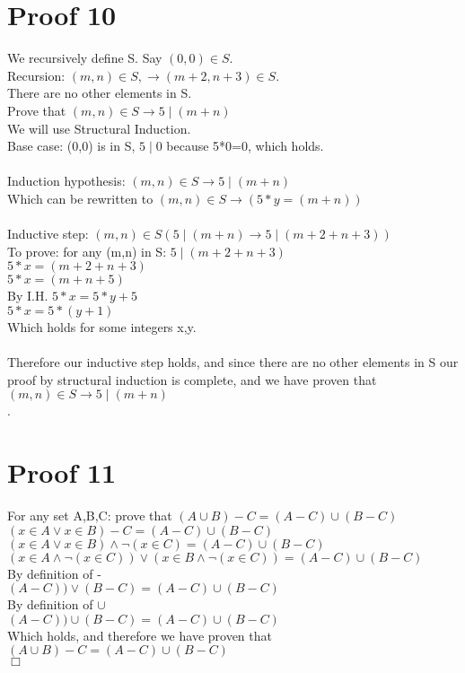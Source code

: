 \documentclass{article}
\begin{document}
\section{Proof 10}
We recursively define S. Say $(0,0) \in S$. \\Recursion: $(m,n) \in S, \rightarrow (m+2,n+3) \in S$. \\There are no other elements in S. \\Prove that $ (m,n) \in S \rightarrow 5 \mid (m+n)$\\
 
We will use Structural Induction. \\
Base case: (0,0) is in S, $5 \mid 0$ because 5*0=0, which holds.\\
\\
Induction hypothesis: $(m,n) \in S \rightarrow 5 \mid (m+n)$\\
Which can be rewritten to $(m,n) \in S \rightarrow (5*y= (m+n))$\\
\\
Inductive step: $(m,n) \in S( 5 \mid (m+n) \rightarrow 5 \mid (m+2+n+3))$\\
To prove: for any (m,n) in S: $5 \mid (m+2+n+3)$\\
$5*x = (m+2+n+3)$\\
$5*x = (m+n+5)$\\
By I.H.
$5*x = 5*y+5$\\
$5*x = 5*(y+1)$\\
Which holds for some integers x,y. \\
\\
Therefore our inductive step holds, and since there are no other elements in S our proof by structural induction is complete, and we have proven that $ (m,n) \in S \rightarrow 5 \mid (m+n)$\\.
 
\section{Proof 11}
For any set A,B,C: prove that $(A \cup B) - C = (A - C) \cup (B - C)$\\
$(x \in A \lor x \in B) - C = (A - C) \cup (B - C)$\\
$(x \in A \lor x \in B) \land \neg (x \in C) = (A - C) \cup (B - C)$\\
$(x \in A \land \neg (x \in C)) \lor (x \in B \land \neg (x \in C)) = (A - C) \cup (B - C)$\\
By definition of -\\
$(A - C)) \lor (B - C) = (A - C) \cup (B - C)$\\
By definition of $\cup$\\
$(A - C)) \cup (B - C) = (A - C) \cup (B - C)$\\
Which holds, and therefore we have proven that $(A \cup B) - C = (A - C) \cup (B - C)$\\
$\Box$
\end{document}
